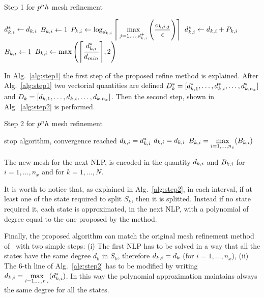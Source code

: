 


\begin{algorithm}
\caption{Step 1 for $p^{n}h$ mesh refinement}\label{alg:step1}
	\begin{algorithmic}[1]
				\State $d_{k,i}^{*} \gets d_{k,i}$
				\State $B_{k,i} \gets 1$  %
			\Else
				\State $P_{k,i} \gets \log_{d_{k,i}} \Bigg\lceil \max\limits_{j= 1, \dots, d_{k,i}^{+}} \Bigg(\dfrac{e_{k,i,j}}{\epsilon}\Bigg) \Bigg\rceil$
				\State $d_{k,i}^{*} \gets d_{k,i} + P_{k,i}$
						\State $B_{k,i} \gets 1$		
					\Else
						\State $B_{k,i} \gets \max\Bigg(\Bigg\lceil \dfrac{d_{k,i}^{*}}{d_{min}}\Bigg\rceil, 2\Bigg)$
					\EndIf
			\EndIf
		\EndFor
	\end{algorithmic}
\end{algorithm}

In Alg.~\ref{alg:step1} the first step of the proposed refine method is explained. After Alg.~\ref{alg:step1} two vectorial quantities are defined $D_{k}^{*} = [d_{k,1}^{*}, \dots, d_{k,i}^{*}, \dots, d_{k,n_x}^{*}]$ and $D_{k} = [d_{k,1}, \dots, d_{k,i}, \dots, d_{k,n_x}]$. Then the second step, shown in Alg.~\ref{alg:step2} is performed.

\begin{algorithm}
	\caption{Step 2 for $p^{n}h$ mesh refinement}\label{alg:step2}
	\begin{algorithmic}[1]
			\If {$\Dks = \Dk$}
				\State stop algorithm, convergence reached	
			\Else
					\State $d_{k,i} = d_{k,i}^{*}$
				\EndFor
			\EndIf
		\Else
				\State $d_{k,i} = d_{k,i}$
				\State $B_{k,i} = \max\limits_{i= 1, \dots, n_x}(B_{k,i})$
			\EndFor		
		\EndIf
	\end{algorithmic}
\end{algorithm}



The new mesh for the next NLP, is encoded in the quantity $d_{k,i}$ and $B_{k,i}$ for $i = 1, \dots, n_x$ and for $k = 1, \dots, N$.

It is worth to notice that, as explained in Alg.~\ref{alg:step2}, in each interval, if at least one of the state required to split $S_k$, then it is splitted. Instead if no state required it, each state is approximated, in the next NLP, with a polynomial of degree equal to the one proposed by the method.

Finally, the proposed algorithm can match the original mesh refinement method of~\cite{Patterson:OCAM:2015} with two simple steps: (i) The first NLP has to be solved in a way that all the states have the same degree $d_k$ in $S_k$, therefore $d_{k,i} = d_k$ (for $i = 1, \dots, n_x$), (ii) The $6$-th line of Alg.~\ref{alg:step2} has to be modified by writing $d_{k,i} = \max\limits_{i= 1, \dots, n_x}(d_{k,i}^{*})$. In this way the polynomial approximation maintains always the same degree for all the states.



